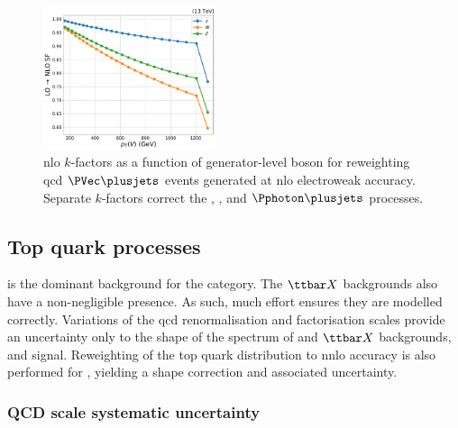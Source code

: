 \begin{figure}[htbp]
    \centering
    \includegraphics[width=0.45\textwidth]{figures/nlo_k_factors/1D_all_ewk.pdf}
    \caption[NLO $k$-factors as a function of generator-level boson \pt for reweighting QCD $\PVec \plusjets$ events generated at LO electroweak accuracy]{\acrshort{nlo} $k$-factors as a function of generator-level boson \pt for reweighting \acrshort{qcd} $\PVec \plusjets$ events generated at \acrshort{nlo} electroweak accuracy. Separate $k$-factors correct the \PW, \PZ, and $\Pphoton\plusjets$ processes.}
    \label{fig:htoinv_nlo_k_factor_ewk}
\end{figure}




\subsection{Top quark processes}
\label{subsec:htoinv_ttbar_uncerts}

\ttbarpjets is the dominant background for the \ttH category. The $\ttbar X$ backgrounds also have a non-negligible presence. As such, much effort ensures they are modelled correctly. Variations of the \acrshort{qcd} renormalisation and factorisation scales provide an uncertainty only to the shape of the \ptmiss spectrum of \ttbar and $\ttbar X$ backgrounds, and \ttH signal. Reweighting of the top quark \pt distribution to \acrshort{nnlo} accuracy is also performed for \ttbar, yielding a shape correction and associated uncertainty.




\subsubsection{QCD scale systematic uncertainty}
\label{subsubsec:ttbar_renorm_fact_scale_uncert}

